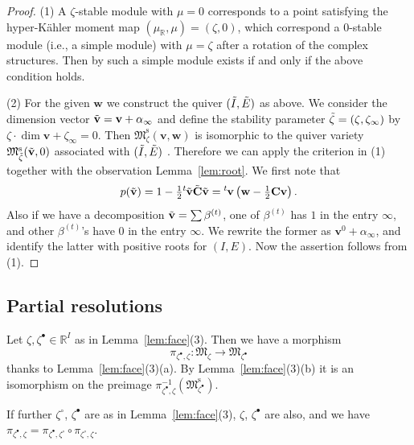 \documentclass[11pt]{article}
\theoremstyle{definition}
\numberwithin{equation}{section}
\newcommand{\lemref}[1]{Lemma~\ref{#1}}
\newcommand{\lsp}[2]{{\mskip-.3mu}{}^{#1}\mskip-1mu{#2}}
\newcommand{\R}{{\mathbb R}}
\newcommand{\M}{{\mathfrak M}} %
\newcommand{\Mreg}{\M^{\operatorname{s}}}
\newcommand{\bv}{{\mathbf v}} %
\newcommand{\bw}{{\mathbf w}} %
\newcommand{\bC}{{\mathbf C}} %
\begin{document}
\begin{proof}
(1) A $\zeta$-stable module with $\mu = 0$ corresponds to a point
satisfying the hyper-K\"ahler moment map $(\mu_\R,\mu) = (\zeta,0)$,
which correspond a $0$-stable module (i.e., a simple module) with $\mu
= \zeta$ after a rotation of the complex structures. Then by
\cite[Theorem~1.2]{CB} such a simple module exists if and only if the
above condition holds.

(2) For the given $\bw$ we construct the quiver $(\Tilde{I},\Tilde{E})$ as
above. We consider the dimension vector $\Tilde{\bv} = \bv + \alpha_\infty$
and def\/ine the stability parameter $\Tilde{\zeta} = (\zeta,\zeta_\infty)$ by
\(
\zeta\cdot \dim \bv + \zeta_\infty = 0.
\)
Then $\Mreg_\zeta(\bv,\bw)$ is isomorphic to the quiver variety
$\Mreg_{\Tilde{\zeta}}(\Tilde{\bv},0)$ associated with
$(\Tilde{I},\Tilde{E})$ \cite[the end of Introduction]{CB}.
%
Therefore we can apply the criterion in (1) together with the
observation \lemref{lem:root}. We f\/irst note that
\[
  p(\Tilde{\bv}) = 1 - \tfrac12 \lsp{t}{\Tilde{\bv}} \Tilde{\bC} \Tilde{\bv}
  = \lsp{t}{\bv}\left(\bw - \tfrac12 \bC \bv\right).
\]
Also if we have a decomposition $\Tilde{\bv} = \sum \beta^{(t)}$, one
of $\beta^{(t)}$ has $1$ in the entry $\infty$, and other
$\beta^{(t)}$'s have $0$ in the entry $\infty$. We rewrite the former
as $\bv^0 + \alpha_\infty$, and identify the latter with positive
roots for $(I,E)$. Now the assertion follows from (1).
\end{proof}

\subsection{Partial resolutions}\label{subsec:partial}

Let $\zeta,\zeta^\bullet\in\R^I$ as in \lemref{lem:face}(3). Then we have a
morphism
\begin{equation*}
   \pi_{\zeta^\bullet,\zeta} \colon \M_\zeta \to \M_{\zeta^\bullet}
\end{equation*}
thanks to \lemref{lem:face}(3)(a). By \lemref{lem:face}(3)(b) it is an
isomorphism on the preimage $\pi_{\zeta^\bullet,\zeta}^{-1}(\Mreg_{\zeta^\bullet})$.

If further $\zeta^\circ$, $\zeta^\bullet$ are as in \lemref{lem:face}(3),
$\zeta$, $\zeta^\bullet$ are also, and we have
\(
  \pi_{\zeta^\bullet,\zeta} = \pi_{\zeta^\bullet,\zeta^\circ}
  \circ \pi_{\zeta^\circ,\zeta}.
\)
\end{document}

